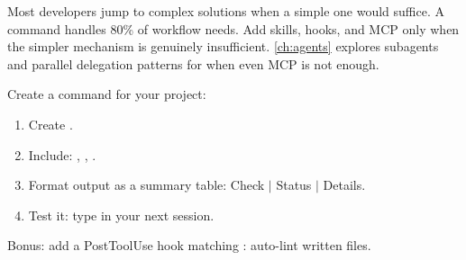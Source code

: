 \begin{keyinsight}
Most developers jump to complex solutions when a simple one would suffice.
A command handles 80\% of workflow needs. Add skills, hooks, and MCP
only when the simpler mechanism is genuinely insufficient.
\cref{ch:agents} explores subagents and parallel delegation patterns
for when even MCP is not enough.
\end{keyinsight}

\begin{trybox}
Create a  command for your project:
\begin{enumerate}
  \item Create .
  \item Include: , ,
    .
  \item Format output as a summary table: Check $|$ Status $|$ Details.
  \item Test it: type  in your next session.
\end{enumerate}
Bonus: add a PostToolUse hook matching : auto-lint written files.
\end{trybox}

